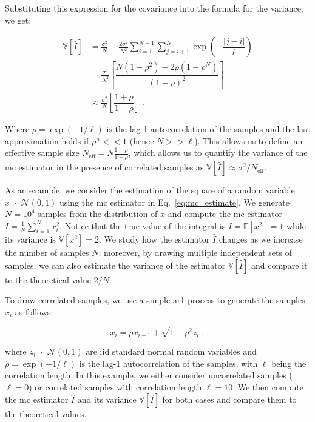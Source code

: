 \smallskip
Substituting this expression for the covariance into the formula for the variance, we get:

\begin{equation}
  \begin{aligned}
    \mathbb{V}[\hat{I}] &= \frac{\sigma^2}{N} + \frac{2\sigma^2}{N^2}\sum_{i=1}^{N-1}\sum_{j=i+1}^N \exp \left(-\dfrac{|j - i|}{\ell}\right) \\
    &= \frac{\sigma^2}{N^2} \left[ \dfrac{N(1-\rho^2) -2\rho(1-\rho^N)}{(1-\rho)^2}\right]\\
    &\approx \frac{\sigma^2}{N} \left[ \dfrac{1+\rho}{1-\rho}\right]\;.
  \end{aligned}
  \label{eq:ess}
\end{equation}

Where $\rho = \exp(-1/\ell)$ is the lag-1 autocorrelation of the samples and the last approximation holds if $\rho^n << 1$ (hence $N >> \ell$). This allows us to define an effective sample size $N_{\mathrm{eff}} = N \frac{1-\rho}{1+\rho}$, which allows us to quantify the variance of the \gls{mc} estimator in the presence of correlated samples as $\mathbb{V}[\hat{I}] \approx \sigma^2 / N_{\mathrm{eff}}$. 

\smallskip
As an example, we consider the estimation of the square of a random variable $x \sim \mathcal{N}(0, 1)$ using the \gls{mc} estimator in Eq.~\eqref{eq:mc_estimate}. We generate $N = 10^4$ samples from the distribution of $x$ and compute the \gls{mc} estimator $\hat{I} = \frac{1}{N} \sum_{i=1}^N x_i^2$. Notice that the true value of the integral is $I = \mathbb{E}[x^2] = 1$ while its variance is $\mathbb{V}[x^2] = 2$. We study how the estimator $\hat{I}$ changes as we increase the number of samples $N$; moreover, by drawing multiple independent sets of samples, we can also estimate the variance of the estimator $\mathbb{V}[\hat{I}]$ and compare it to the theoretical value $2 / N$. 

\smallskip
To draw correlated samples, we use a simple \gls{ar1} process to generate the samples $x_i$ as follows:

\begin{equation}
  x_i = \rho x_{i-1} + \sqrt{1 - \rho^2} z_i\;,
  \label{eq:ar1}
\end{equation}

where $z_i \sim \mathcal{N}(0, 1)$ are \gls{iid} standard normal random variables and $\rho = \exp(-1/\ell)$ is the lag-1 autocorrelation of the samples, with $\ell$ being the correlation length. In this example, we either consider uncorrelated samples ($\ell = 0$) or correlated samples with correlation length $\ell = 10$. We then compute the \gls{mc} estimator $\hat{I}$ and its variance $\mathbb{V}[\hat{I}]$ for both cases and compare them to the theoretical values.


